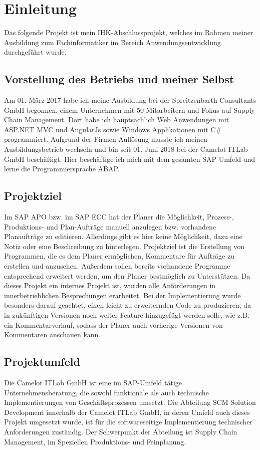 \section{Einleitung}
\label{sec:Einleitung}
Das folgende Projekt ist mein IHK-Abschlussprojekt, welches im Rahmen meiner Ausbildung zum Fachinformatiker im Bereich Anwendungsentwicklung durchgeführt wurde.

\subsection{Vorstellung des Betriebs und meiner Selbst} 
\label{sec:Vorstellung des Betriebs und meiner Selbst}
Am 01. März 2017 habe ich meine Ausbildung bei der Spreitzenbarth Consultants GmbH begonnen, einem Unternehmen mit 50 Mitarbeitern und Fokus auf Supply Chain Management. Dort habe ich hauptsächlich Web Anwendungen mit ASP.NET MVC und AngularJs sowie Windows Applikationen mit C\# programmiert. Aufgrund der Firmen Auflösung musste ich meinen Ausbildungsbetrieb wechseln und bin seit 01. Juni 2018 bei der Camelot ITLab GmbH beschäftigt. Hier beschäftige ich mich mit dem gesamten SAP Umfeld und lerne die Programmiersprache \ac{ABAP}.

\subsection{Projektziel} 
\label{sec:Projektziel}
Im SAP \ac{APO} bzw. im SAP \ac{ECC} hat der Planer die Möglichkeit, Prozess-, Produktions- und Plan-Aufträge manuell anzulegen bzw. vorhandene Planaufträge zu editieren. Allerdings gibt es hier keine Möglichkeit, dazu eine Notiz oder eine Beschreibung zu hinterlegen. Projektziel ist die Erstellung von Programmen, die es dem Planer ermöglichen, Kommentare	für Aufträge zu erstellen und anzusehen. Außerdem sollen bereits vorhandene Programme entsprechend erweitert werden, um den Planer bestmöglich zu Unterstützen. Da dieses Projekt ein internes Projekt ist, wurden alle Anforderungen in innerbetrieblichen Besprechungen erarbeitet. Bei der Implementierung wurde besonders darauf geachtet, einen leicht zu erweiternden Code zu produzieren, da in zukünftigen Versionen noch weiter Feature hinzugefügt werden solle, wie z.B. ein Kommentarverlauf, sodass der Planer auch vorherige Versionen von Kommentaren anschauen kann. 

\subsection{Projektumfeld}
\label{sec:Projektumfeld}
Die Camelot ITLab GmbH ist eine im SAP-Umfeld tätige Unternehmensberatung, die sowohl funktionale als auch technische Implementierungen von Geschäftsprozessen umsetzt.	Die Abteilung SCM Solution Development innerhalb der Camelot ITLab GmbH, in deren Umfeld	auch dieses Projekt umgesetzt wurde, ist für die softwareseitige Implementierung technischer	Anforderungen zuständig. Der Schwerpunkt der Abteilung ist Supply Chain Management, im Speziellen Produktions- und Feinplanung.

